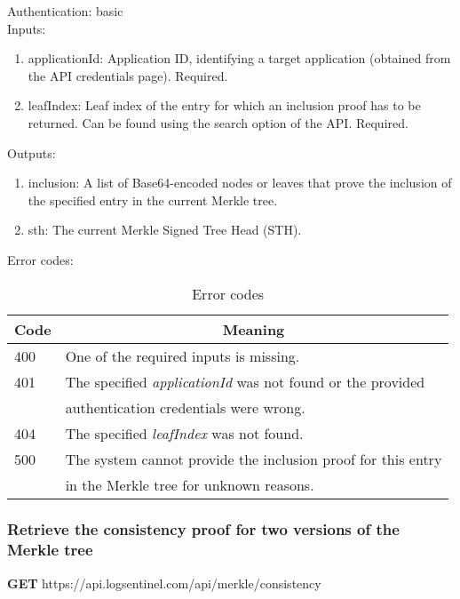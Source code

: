 \documentclass{article}
\begin{document}
		\noindent Authentication: basic \\
		
		\noindent Inputs:
		\begin{enumerate}
			\item applicationId: Application ID, identifying a target application (obtained from the API credentials page). Required.
			\item leafIndex: Leaf index of the entry for which an inclusion proof has to be returned. Can be found using the search option of the API. Required.
		\end{enumerate}
		
		\noindent Outputs:
		\begin{enumerate}
			\item inclusion: A list of Base64-encoded nodes or leaves that prove the inclusion of the specified entry in the current Merkle tree.
			\item sth: The current Merkle Signed Tree Head (STH).
		\end{enumerate}
		
		\noindent Error codes:
		\begin{table}[H]
			\centering
			\caption{Error codes}
			\label{merkle-inclusion-error-codes}
			\begin{tabular}{|l|l|}
				\hline
				\multicolumn{1}{|c|}{Code} & 	\multicolumn{1}{c|}{Meaning} \\ \hline
				400 & One of the required inputs is missing. \\ \hline
				401 & The specified \textit{applicationId} was not found or the provided \\
				& authentication credentials were wrong. \\ \hline
				404 & The specified \textit{leafIndex} was not found. \\ \hline
				500 & The system cannot provide the inclusion proof for this entry \\ & in the Merkle tree for unknown  reasons. \\ \hline
			\end{tabular}
		\end{table}
	
		\subsubsection{Retrieve the consistency proof for two versions of the Merkle tree}
		
		\textbf{GET} https://api.logsentinel.com/api/merkle/consistency \\
		
\end{document}
